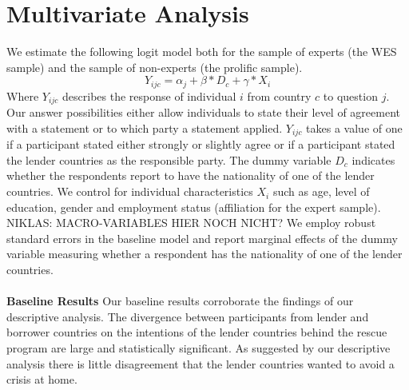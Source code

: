 \clearpage
\section{Multivariate Analysis}
We estimate the following logit model both for the sample of experts (the WES sample) and the sample of non-experts (the prolific sample). 
\begin{equation*}
    Y_{ijc}= \alpha_{j}+ \beta *D_{c} + \gamma*X_{i}
\end{equation*}
Where $Y_{ijc}$ describes the response of individual $i$ from country $c$ to question $j$. Our answer possibilities either allow individuals to state their level of agreement with a statement or to which party a statement applied. $Y_{ijc}$ takes a value of one if a participant stated either strongly or slightly agree or if a participant stated the lender countries as the responsible party. The dummy variable $D_{c}$ indicates whether the respondents report to have the nationality of one of the lender countries. We control for individual characteristics $X_{i}$ such as age, level of education, gender and employment status (affiliation for the expert sample). NIKLAS: MACRO-VARIABLES HIER NOCH NICHT? We employ robust standard errors in the baseline model and report marginal effects of the dummy variable measuring whether a respondent has the nationality of one of the lender countries.
\\ \\
\textbf{Baseline Results} 
Our baseline results corroborate the findings of our descriptive analysis. The divergence between participants from lender and borrower countries on the intentions of the lender countries behind the rescue program are large and statistically significant. As suggested by our descriptive analysis there is little disagreement that the lender countries wanted to avoid a crisis at home.  \\ 
